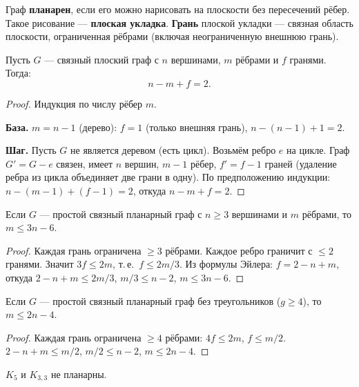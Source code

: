 \documentclass[12pt]{article}
\begin{document}
\begin{definition}
Граф \textbf{планарен}, если его можно нарисовать на плоскости
без пересечений рёбер. Такое рисование --- \textbf{плоская укладка}.
\textbf{Грань} плоской укладки --- связная область плоскости,
ограниченная рёбрами (включая неограниченную внешнюю грань).
\end{definition}

\begin{theorem}
Пусть $G$ --- связный плоский граф с $n$ вершинами, $m$ рёбрами
и $f$ гранями. Тогда:
\[
n - m + f = 2.
\]
\end{theorem}

\begin{proof}
Индукция по числу рёбер $m$.

\textbf{База.} $m = n-1$ (дерево): $f = 1$ (только внешняя грань),
$n - (n-1) + 1 = 2$. \checkmark

\textbf{Шаг.} Пусть $G$ не является деревом (есть цикл).
Возьмём ребро $e$ на цикле. Граф $G' = G - e$ связен,
имеет $n$ вершин, $m-1$ рёбер, $f' = f-1$ граней
(удаление ребра из цикла объединяет две грани в одну).
По предположению индукции: $n - (m-1) + (f-1) = 2$,
откуда $n - m + f = 2$.
\end{proof}

\begin{corollary}\label{cor:euler-edges}
Если $G$ --- простой связный планарный граф с $n \geq 3$ вершинами
и $m$ рёбрами, то $m \leq 3n - 6$.
\end{corollary}

\begin{proof}
Каждая грань ограничена $\geq 3$ рёбрами. Каждое ребро граничит
с $\leq 2$ гранями. Значит $3f \leq 2m$, т.\,е.\ $f \leq 2m/3$.
Из формулы Эйлера: $f = 2 - n + m$, откуда
$2 - n + m \leq 2m/3$, $m/3 \leq n-2$, $m \leq 3n-6$.
\end{proof}

\begin{corollary}
Если $G$ --- простой связный планарный граф без треугольников
($g \geq 4$), то $m \leq 2n - 4$.
\end{corollary}

\begin{proof}
Каждая грань ограничена $\geq 4$ рёбрами: $4f \leq 2m$, $f \leq m/2$.
$2 - n + m \leq m/2$, $m/2 \leq n-2$, $m \leq 2n-4$.
\end{proof}

\begin{corollary}
$K_5$ и $K_{3,3}$ не планарны.
\end{corollary}
\end{document}
